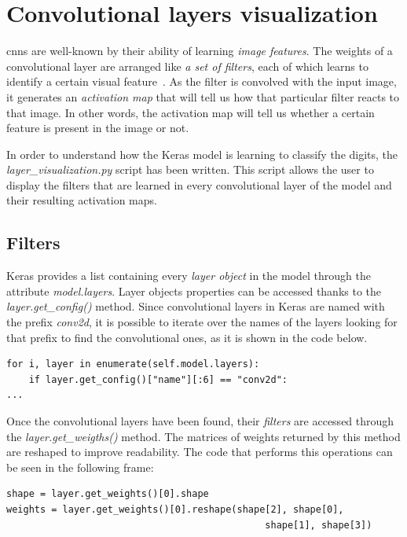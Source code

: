 \section{Convolutional layers visualization}\label{sec:visualization}
\glspl{cnn} are well-known by their ability of learning \emph{image features}. The weights of a convolutional layer are arranged like \emph{a set of filters}, each of which learns to identify a certain visual feature~\cite{cs231n}. As the filter is convolved with the input image, it generates an \emph{activation map} that will tell us how that particular filter reacts to that image. In other words, the activation map will tell us whether a certain feature is present in the image or not.

In order to understand how the Keras model is learning to classify the digits, the \emph{\textit{layer\_visualization.py}} script has been written. This script allows the user to display the filters that are learned in every convolutional layer of the model and their resulting activation maps.

\subsection{Filters}
Keras provides a list containing every \emph{layer object} in the model through the attribute \textit{model.layers}. Layer objects properties can be accessed thanks to the \textit{layer.get\_config()} method. Since convolutional layers in Keras are named with the prefix \textit{conv2d}, it is possible to iterate over the names of the layers looking for that prefix to find the convolutional ones, as it is shown in the code below.

\begin{lstlisting}
for i, layer in enumerate(self.model.layers):
	if layer.get_config()["name"][:6] == "conv2d":
...
\end{lstlisting}

Once the convolutional layers have been found, their \emph{filters} are accessed through the \textit{layer.get\_weigths()} method. The matrices of weights returned by this method are reshaped to improve readability. The code that performs this operations can be seen in the following frame:

\begin{lstlisting}
shape = layer.get_weights()[0].shape
weights = layer.get_weights()[0].reshape(shape[2], shape[0],
                                              shape[1], shape[3])
\end{lstlisting}

